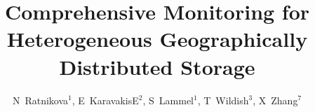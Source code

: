 \documentclass[a4paper]{jpconf}
\begin{document}
\title{Comprehensive Monitoring for Heterogeneous Geographically Distributed Storage}

\author{N~Ratnikova$^1$, E~KaravakisE$^2$, S~Lammel$^1$, T~Wildish$^3$,
	X~Zhang$^7$}

\address{$^1$ Fermi National Accelerator Laboratory, US}
\address{$^2$ CERN, CH}
\address{$^3$ Princeton University, US}









% 
% 

\par

\end{document}
